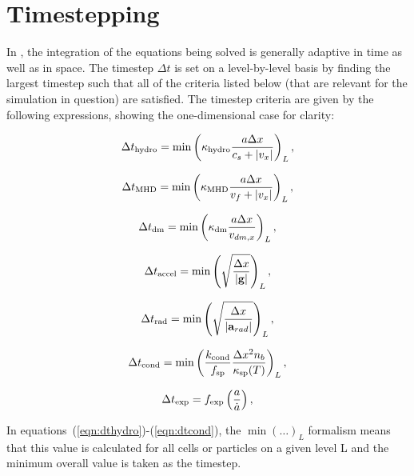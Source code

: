 \section{Timestepping}
\label{sec.timestepping}

In \enzo, the integration of the equations being solved is generally adaptive in time 
as well as in space.  The timestep $\Delta t$ is set on a level-by-level
basis by finding the largest timestep such that all of the criteria
listed below (that are relevant for the simulation in question) are
satisfied.  The timestep criteria are given by the following
expressions, showing the one-dimensional case for clarity:

\begin{equation}
\Delta t_{\rm hydro} = \min \left( \kappa_{\rm hydro} \frac{a \Delta x}{c_{s} + |v_x|} \right)_L ,
\label{eqn:dthydro}
\end{equation}

\begin{equation}
\Delta t_{\rm MHD} = \min \left( \kappa_{\rm MHD} \frac{a \Delta x}{v_{f} + |v_x|} \right)_L ,
\label{eqn:dtMHD}
\end{equation}

\begin{equation}
\Delta t_{\rm dm} = \min \left(\kappa_{\rm dm} \frac{a \Delta x}{v_{dm,x}} \right)_L ,
\label{eqn:dtdarkmatter}
\end{equation}

\begin{equation}
\Delta t_{\rm accel} = \min \left( \sqrt{\frac{\Delta x}{|\myvec{g}|}} \right)_L ,
\label{eqn:dtaccel}
\end{equation}

\begin{equation}
\Delta t_{\rm rad} = \min \left(  \sqrt{\frac{\Delta x}{|\myvec{a}_{rad}|}} \right)_L,
\label{eqn:dtrad}
\end{equation}

\begin{equation}
\Delta t_{\rm cond} = \min \left(  \frac{ k_{\rm cond}}{f_{\rm sp}} \frac{\Delta x^2
    n_b}{\kappa_{\rm sp}(T)} \right)_L,
\label{eqn:dtcond}
\end{equation}

\begin{equation}
\Delta t_{\rm exp} = f_{\rm exp} \left( \frac{a}{\dot{a}} \right) ,
\label{eqn:dtexpand}
\end{equation}

In equations~(\ref{eqn:dthydro})-(\ref{eqn:dtcond}), the $\min ( \ldots)_L$ 
formalism means that this value is calculated for all cells or
particles on a given level L and the minimum overall value is taken as the timestep.

